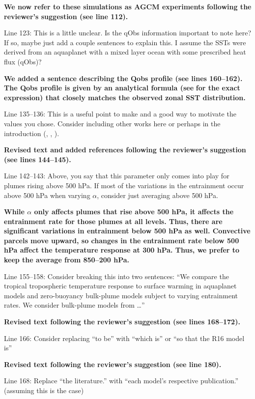 \documentclass[11pt]{article}
\begin{document}
\textbf{We now refer to these simulations as AGCM experiments following the reviewer's suggestion (see line 112).}

Line 123: This is a little unclear. Is the qObs information important to note here? If so, maybe just add a couple sentences to explain this. I assume the SSTs were derived from an aquaplanet with a mixed layer ocean with some prescribed heat flux (qObs)?

\textbf{We added a sentence describing the Qobs profile (see lines 160--162). The Qobs profile is given by an analytical formula (see} \cite{neale_standard_2000} \textbf{for the exact expression) that closely matches the observed zonal SST distribution.}

Line 135--136: This is a useful point to make and a good way to motivate the values you chose. Consider including other works here or perhaps in the introduction (\cite{jang_simulation_2013}, \cite{ham_what_2013}, \cite{kim_ninosouthern_2011}).

\textbf{Revised text and added references following the reviewer's suggestion (see lines 144--145).}

Line 142--143: Above, you say that this parameter only comes into play for plumes rising above 500 hPa. If most of the variations in the entrainment occur above 500 hPa when varying \(\alpha\), consider just averaging above 500 hPa.

\textbf{While $\alpha$ only affects plumes that rise above 500 hPa, it affects the entrainment rate for those plumes at all levels. Thus, there are significant variations in entrainment below 500 hPa as well. Convective parcels move upward, so changes in the entrainment rate below 500 hPa affect the temperature response at 300 hPa. Thus, we prefer to keep the average from 850--200 hPa.}

Line 155--158: Consider breaking this into two sentences: ``We compare the tropical tropospheric temperature response to surface warming in aquaplanet models and zero-buoyancy bulk-plume models subject to varying entrainment rates. We consider bulk-plume models from \ldots{}''

\textbf{Revised text following the reviewer's suggestion (see lines 168--172).}

Line 166: Consider replacing ``to be'' with ``which is'' or ``so that the R16 model is''

\textbf{Revised text following the reviewer's suggestion (see line 180).}

Line 168: Replace ``the literature.'' with ``each model's respective publication.'' (assuming this is the case)
\end{document}
